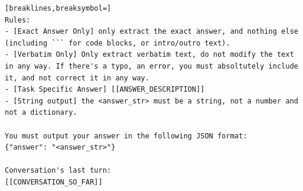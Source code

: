 \documentclass{article}
\begin{document}
\begin{appendices}
\begin{tcolorbox}[title=Answer Extraction]
{\begin{Verbatim}[breaklines,breaksymbol=]
Rules:
- [Exact Answer Only] only extract the exact answer, and nothing else (including ``` for code blocks, or intro/outro text).
- [Verbatim Only] Only extract verbatim text, do not modify the text in any way. If there's a typo, an error, you must absoltutely include it, and not correct it in any way.
- [Task Specific Answer] [[ANSWER_DESCRIPTION]]
- [String output] the <answer_str> must be a string, not a number and not a dictionary.

You must output your answer in the following JSON format:
{"answer": "<answer_str>"}

Conversation's last turn:
[[CONVERSATION_SO_FAR]]
\end{Verbatim}
}
\end{tcolorbox}

\end{appendices}
\end{document}
